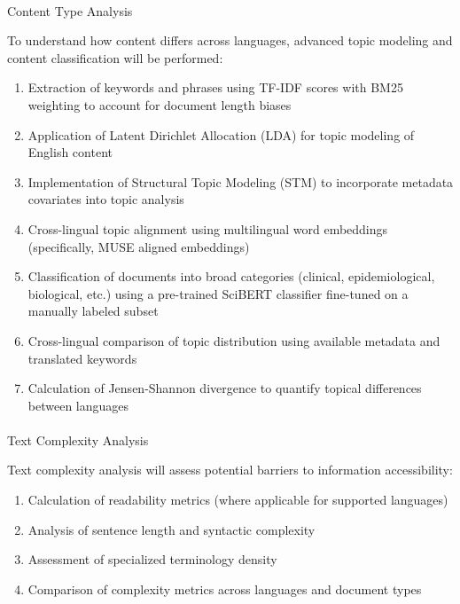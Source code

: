 \documentclass[
]{article}
\makeatletter
\let\oldparagraph\paragraph
\renewcommand{\paragraph}{
    \@ifstar
      \xxxParagraphStar
      \xxxParagraphNoStar
  }
\newcommand{\xxxParagraphStar}[1]{\oldparagraph*{#1}\mbox{}}
\newcommand{\xxxParagraphNoStar}[1]{\oldparagraph{#1}\mbox{}}
\providecommand{\tightlist}{%
  \setlength{\itemsep}{0pt}\setlength{\parskip}{0pt}}\usepackage{longtable,booktabs,array}
\makeatother
\begin{document}
\paragraph{Content Type Analysis}\label{content-type-analysis}

To understand how content differs across languages, advanced topic
modeling and content classification will be performed:

\begin{enumerate}
\def\labelenumi{\arabic{enumi}.}
\tightlist
\item
  Extraction of keywords and phrases using TF-IDF scores with BM25
  weighting to account for document length biases
\item
  Application of Latent Dirichlet Allocation (LDA) for topic modeling of
  English content
\item
  Implementation of Structural Topic Modeling (STM) to incorporate
  metadata covariates into topic analysis
\item
  Cross-lingual topic alignment using multilingual word embeddings
  (specifically, MUSE aligned embeddings)
\item
  Classification of documents into broad categories (clinical,
  epidemiological, biological, etc.) using a pre-trained SciBERT
  classifier fine-tuned on a manually labeled subset
\item
  Cross-lingual comparison of topic distribution using available
  metadata and translated keywords
\item
  Calculation of Jensen-Shannon divergence to quantify topical
  differences between languages
\end{enumerate}

\paragraph{Text Complexity Analysis}\label{text-complexity-analysis}

Text complexity analysis will assess potential barriers to information
accessibility:

\begin{enumerate}
\def\labelenumi{\arabic{enumi}.}
\tightlist
\item
  Calculation of readability metrics (where applicable for supported
  languages)
\item
  Analysis of sentence length and syntactic complexity
\item
  Assessment of specialized terminology density
\item
  Comparison of complexity metrics across languages and document types
\end{enumerate}
\end{document}
